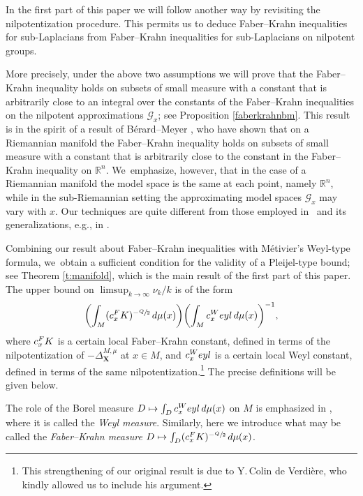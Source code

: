 \documentclass[11pt]{article}
\newcommand\mto{\mathchoice{\longmapsto}{\mapsto}{\mapsto}{\mapsto}}
\let\oldsfrac\sfrac
\renewcommand{\sfrac}[2]{{\oldsfrac{#1}{#2}}}
\newcommand{\FK}{\textup{FK}}
\newcommand{\Weyl}{\textup{Weyl}}
\newcommand{\bX}{{\boldsymbol{X}}}
\theoremstyle{definition}
\newcommand{\1}{\mathbbm{1}}
\newcommand{\R}{\mathbb{R}}
\numberwithin{equation}{section}
\begin{document}
In the first part of this paper we will follow another way by revisiting the nilpotentization procedure. This permits us to deduce Faber--Krahn inequalities for sub-Laplacians from Faber--Krahn inequalities for sub-Laplacians on nilpotent groups.

More precisely, under the above two assumptions we will prove that the Faber--Krahn inequality holds on subsets of small measure with a constant that is arbitrarily close to an integral over the constants of the Faber--Krahn inequalities on the nilpotent approximations $\mathcal G_x$; see Proposition \ref{faberkrahnbm}. This result is in the spirit of a result of Bérard--Meyer \cite[Part\,II, Lem.\,16]{BerMe}, who have shown that on a Riemannian manifold the Faber--Krahn inequality holds on subsets of small measure with a constant that is arbitrarily close to the constant in the Faber--Krahn inequality on $\R^n$. We~emphasize, however, that in the case of a Riemannian manifold the model space is the same at each point, namely $\R^n$, while in the sub-Riemannian setting the approximating model spaces $\mathcal G_x$ may vary with $x$. Our techniques are quite different from those employed in~\cite{BerMe} and its generalizations, e.g., in \cite{DFV}.

Combining our result about Faber--Krahn inequalities with Métivier's Weyl-type formula, we~obtain a sufficient condition for the validity of a Pleijel-type bound; see Theorem \ref{t:manifold}, which is the main result of the first part of this paper. The upper bound on $\limsup_{k\to\infty} \nu_k/k$ is of the form\enlargethispage{\baselineskip}
\begin{equation}
\label{eq:mainintro}
\biggl(\int_M (c_x^\FK)^{-\sfrac Q2} \,d\mu(x) \biggr) \biggl(\int_M c_x^\Weyl\,d\mu(x) \biggr)^{-1},
\end{equation}
where $c_x^\FK$ is a certain local Faber--Krahn constant, defined in terms of the nilpotentization of $-\Delta_\bX^{M,\mu}$ at $x\in M$, and $c_x^\Weyl$ is a certain local Weyl constant, defined in terms of the same nilpotentization.\footnote{This strengthening of our original result \cite{FrHe1,FrHe2} is due to Y.\,Colin de Verdière, who kindly allowed us to include his argument.} The precise definitions will be given below.

The role of the Borel measure $D\mto \int_D c_x^\Weyl\,d\mu(x)$ on $M$ is emphasized in \cite{CHT1}, where it is called the \emph{Weyl measure}. Similarly, here we introduce what may be called the \emph{Faber--Krahn measure} $D\mto \int_D (c_x^\FK)^{-\sfrac Q2} \,d\mu(x)$.
\end{document}
